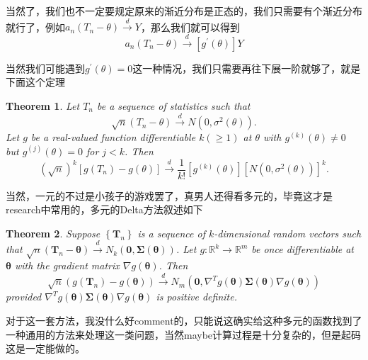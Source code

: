 \documentclass{article}
\newtheorem{theorem}{Theorem}[section]
\begin{document}
当然了，我们也不一定要规定原来的渐近分布是正态的，我们只需要有个渐近分布就行了，例如$a_{n}\left(T_n-\theta\right)\stackrel{d}{\rightarrow}Y$，那么我们就可以得到
$$
a_{n}\left(T_n-\theta\right)\stackrel{d}{\rightarrow}[g^{'}\left(\theta\right)]Y
$$
\par 当然我们可能遇到$g^{'}\left(\theta\right)=0$这一种情况，我们只需要再往下展一阶就够了，就是下面这个定理
\begin{theorem}
	Let $T_n$ be a sequence of statistics such that
	$$
	\sqrt{n}\left(T_n-\theta\right) \stackrel{d}{\rightarrow} N\left(0, \sigma^2(\theta)\right) .
	$$
	Let $g$ be a real-valued function differentiable $k(\geq 1)$ at $\theta$ with $g^{(k)}(\theta) \neq 0$ but $g^{(j)}(\theta)=0$ for $j<k$. Then
	$$
	(\sqrt{n})^k\left[g\left(T_n\right)-g(\theta)\right] \stackrel{d}{\rightarrow} \frac{1}{k !}\left[g^{(k)}(\theta)\right]\left[N\left(0, \sigma^2(\theta)\right)\right]^k .
	$$
\end{theorem}
当然，一元的不过是小孩子的游戏罢了，真男人还得看多元的，毕竟这才是research中常用的，多元的Delta方法叙述如下
\begin{theorem}
	Suppose $\left\{\mathbf{T}_n\right\}$ is a sequence of $k$-dimensional random vectors such that $\sqrt{n}\left(\mathbf{T}_n-\boldsymbol{\theta}\right) \stackrel{d}{\rightarrow} N_k(\mathbf{0}, \boldsymbol{\Sigma}(\boldsymbol{\theta}))$. Let $g: \mathbb{R}^k \rightarrow \mathbb{R}^m$ be once differentiable at $\boldsymbol{\theta}$ with the gradient matrix $\nabla g(\boldsymbol{\theta})$. Then
	$$
	\sqrt{n}\left(g\left(\mathbf{T}_n\right)-g(\boldsymbol{\theta})\right) \stackrel{d}{\rightarrow} N_m\left(\mathbf{0}, \nabla^T g(\boldsymbol{\theta}) \boldsymbol{\Sigma}(\boldsymbol{\theta}) \nabla g(\boldsymbol{\theta})\right)
	$$
	provided $\nabla^T g(\boldsymbol{\theta}) \boldsymbol{\Sigma}(\boldsymbol{\theta}) \nabla g(\boldsymbol{\theta})$ is positive definite.
\end{theorem}
对于这一套方法，我没什么好comment的，只能说这确实给这种多元的函数找到了一种通用的方法来处理这一类问题，当然maybe计算过程是十分复杂的，但是起码这是一定能做的。
\end{document}
